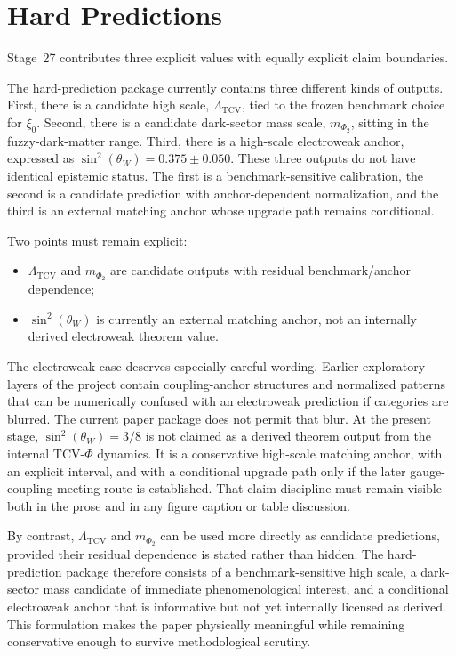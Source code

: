\documentclass[11pt]{article}
\begin{document}
\section{Hard Predictions}
Stage~27 contributes three explicit values with equally explicit claim boundaries.



The hard-prediction package currently contains three different kinds of outputs. First, there is a candidate high scale, $\Lambda_{\mathrm{TCV}}$, tied to the frozen benchmark choice for $\xi_0$. Second, there is a candidate dark-sector mass scale, $m_{\Phi_2}$, sitting in the fuzzy-dark-matter range. Third, there is a high-scale electroweak anchor, expressed as $\sin^2(\theta_W)=0.375\pm0.050$. These three outputs do not have identical epistemic status. The first is a benchmark-sensitive calibration, the second is a candidate prediction with anchor-dependent normalization, and the third is an external matching anchor whose upgrade path remains conditional.

Two points must remain explicit:
\begin{itemize}
    \item $\Lambda_{\mathrm{TCV}}$ and $m_{\Phi_2}$ are candidate outputs with residual benchmark/anchor dependence;
    \item $\sin^2(\theta_W)$ is currently an external matching anchor, not an internally derived electroweak theorem value.
\end{itemize}

The electroweak case deserves especially careful wording. Earlier exploratory layers of the project contain coupling-anchor structures and normalized patterns that can be numerically confused with an electroweak prediction if categories are blurred. The current paper package does not permit that blur. At the present stage, $\sin^2(\theta_W)=3/8$ is not claimed as a derived theorem output from the internal TCV-$\Phi$ dynamics. It is a conservative high-scale matching anchor, with an explicit interval, and with a conditional upgrade path only if the later gauge-coupling meeting route is established. That claim discipline must remain visible both in the prose and in any figure caption or table discussion.

By contrast, $\Lambda_{\mathrm{TCV}}$ and $m_{\Phi_2}$ can be used more directly as candidate predictions, provided their residual dependence is stated rather than hidden. The hard-prediction package therefore consists of a benchmark-sensitive high scale, a dark-sector mass candidate of immediate phenomenological interest, and a conditional electroweak anchor that is informative but not yet internally licensed as derived. This formulation makes the paper physically meaningful while remaining conservative enough to survive methodological scrutiny.
\end{document}
